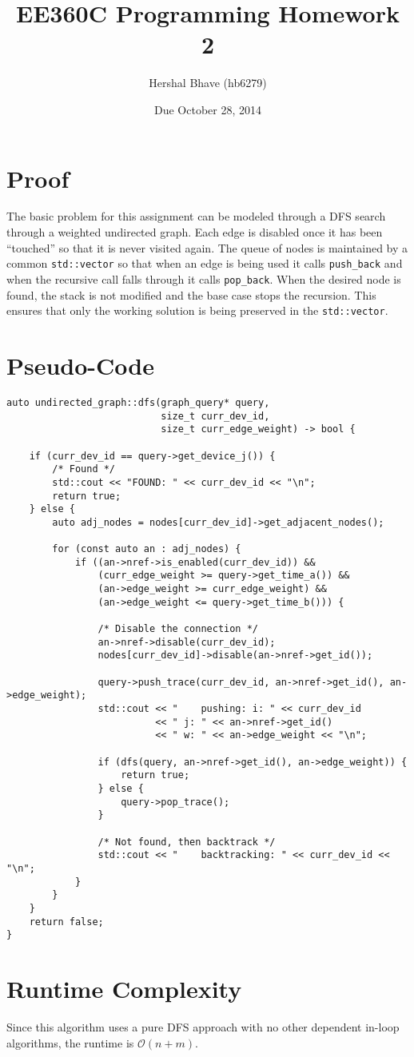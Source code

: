 \documentclass{article}
\title{EE360C Programming Homework 2}
\author{Hershal Bhave (hb6279)}
\date{Due October 28, 2014}
\begin{document}
\maketitle

\section{Proof}
The basic problem for this assignment can be modeled through a DFS
search through a weighted undirected graph. Each edge is disabled once
it has been ``touched'' so that it is never visited again. The queue
of nodes is maintained by a common \verb|std::vector| so that when an
edge is being used it calls \verb|push_back| and when the recursive
call falls through it calls \verb|pop_back|. When the desired node is
found, the stack is not modified and the base case stops the
recursion. This ensures that only the working solution is being
preserved in the \verb|std::vector|.

\section{Pseudo-Code}
{  \footnotesize
\begin{verbatim}
auto undirected_graph::dfs(graph_query* query,
                           size_t curr_dev_id,
                           size_t curr_edge_weight) -> bool {

    if (curr_dev_id == query->get_device_j()) {
        /* Found */
        std::cout << "FOUND: " << curr_dev_id << "\n";
        return true;
    } else {
        auto adj_nodes = nodes[curr_dev_id]->get_adjacent_nodes();

        for (const auto an : adj_nodes) {
            if ((an->nref->is_enabled(curr_dev_id)) &&
                (curr_edge_weight >= query->get_time_a()) &&
                (an->edge_weight >= curr_edge_weight) &&
                (an->edge_weight <= query->get_time_b())) {

                /* Disable the connection */
                an->nref->disable(curr_dev_id);
                nodes[curr_dev_id]->disable(an->nref->get_id());

                query->push_trace(curr_dev_id, an->nref->get_id(), an->edge_weight);
                std::cout << "    pushing: i: " << curr_dev_id
                          << " j: " << an->nref->get_id()
                          << " w: " << an->edge_weight << "\n";

                if (dfs(query, an->nref->get_id(), an->edge_weight)) {
                    return true;
                } else {
                    query->pop_trace();
                }

                /* Not found, then backtrack */
                std::cout << "    backtracking: " << curr_dev_id << "\n";
            }
        }
    }
    return false;
}
\end{verbatim}
}

\section{Runtime Complexity}
Since this algorithm uses a pure DFS approach with no other dependent
in-loop algorithms, the runtime is $\mathcal{O}(n+m)$.
\end{document}
